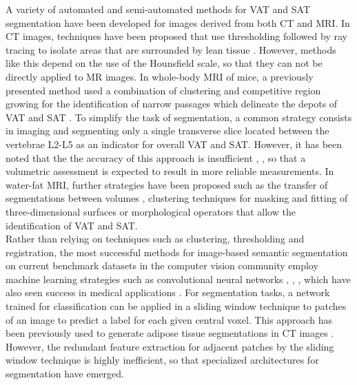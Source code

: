\documentclass[10pt,letterpaper]{article}
\begin{document}
	A variety of automated and semi-automated methods for VAT and SAT segmentation have been developed for images derived from both CT and MRI. In CT images, techniques have been proposed that use thresholding followed by ray tracing to isolate areas that are surrounded by lean tissue \cite{kullberg2017automated}. However, methods like this depend on the use of the Hounsfield scale, so that they can not be directly applied to MR images.
	In whole-body MRI of mice, a previously presented method used a combination of clustering and competitive region growing for the identification of narrow passages which delineate the depots of VAT and SAT \cite{ranefall2009automatic}. To simplify the task of segmentation, a common strategy consists in imaging and segmenting only a single transverse slice located between the vertebrae L2-L5 as an indicator for overall VAT and SAT. However, it has been noted that the the accuracy of this approach is insufficient \cite{addeman2015validation}, \cite{shen2016automatic}, so that a volumetric assessment is expected to result in more reliable measurements. In water-fat MRI, further strategies have been proposed such as the transfer of segmentations between volumes \cite{joshi2013automatic}, clustering techniques for masking and fitting of three-dimensional surfaces \cite{addeman2015validation} or morphological operators that allow the identification of VAT and SAT. \\
	
	Rather than relying on techniques such as clustering, thresholding and registration, the most successful methods for image-based semantic segmentation on current benchmark datasets in the computer vision community employ machine learning strategies such as convolutional neural networks \cite{everingham2015pascal}, \cite{garcia2017review}, \cite{lecun2015deep}, which have also seen success in medical applications \cite{shen2017deep}. For segmentation tasks, a network trained for classification can be applied in a sliding window technique to patches of an image to predict a label for each given central voxel. This approach has been previously used to generate adipose tissue segmentations in CT images \cite{wang2017two}. However, the redundant feature extraction for adjacent patches by the sliding window technique is highly inefficient, so that specialized architectures for segmentation have emerged.
	
\end{document}
